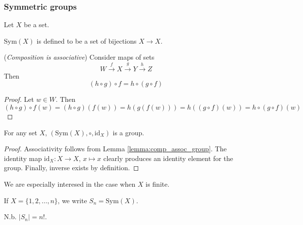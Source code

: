 \documentclass[10pt, a4paper, twoside]{report}
\begin{document}
\subsubsection{Symmetric groups}
Let \(X\) be a set.
\begin{definition}
    \(\mathrm{Sym}(X)\) is defined to be a set of bijections \(X\to X\).
\end{definition}
\begin{lemma}
    (\emph{Composition is associative}) Consider maps of sets 
    \[W\xrightarrow{f}X\xrightarrow{g}Y\xrightarrow{h}Z\]
    Then 
    \[(h\circ g)\circ f=h\circ(g\circ f)\]
    \label{lemma:comp_assoc_group}
\end{lemma}
\begin{proof}
    Let \(w\in W\). Then 
    \[(h\circ g)\circ f(w)=(h\circ g)(f(w))=h(g(f(w)))=h((g\circ f)(w))=h\circ(g\circ f)(w)\]
\end{proof}
\begin{proposition}
    For any set \(X\), \((\mathrm{Sym}(X),\circ,\mathrm{id}_X)\) is a group.
\end{proposition}
\begin{proof}
    Associativity follows from Lemma \ref{lemma:comp_assoc_group}. The identity map \(\mathrm{id}_X:X\to X\), \(x\mapsto x\) clearly produces an identity element for the group. Finally, inverse exists by definition.
\end{proof}
We are especially interesed in the case when \(X\) is finite.
\begin{definition}
    If \(X=\{1,2,\ldots,n\}\), we write \(S_n=\mathrm{Sym}(X)\).
\end{definition}
N.b. \(|S_n|=n!\).
\end{document}
